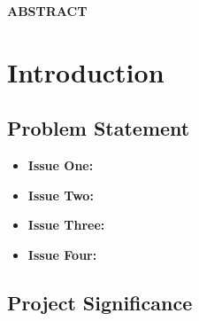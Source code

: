 \documentclass[12pt, a4paper, oneside]{report}
\newcommand{\frontmatterheading}[1]{%
  \begin{center}\Large\bfseries #1\end{center}
  \vspace{0.5cm}
}
\begin{document}
\clearpage
\thispagestyle{plain}
\frontmatterheading{ABSTRACT}

\lipsum[1]

\lipsum[2][1-5]

\clearpage
\tableofcontents
\listoffigures
{}
\listoftables
{}

\clearpage
{}
\setcounter{page}{1}

\chapter{Introduction}
\label{chap:introduction}

\lipsum[3][1-7]

\section{Problem Statement}
\label{sec:problem-statement}

\lipsum[4][1-2]

\begin{itemize}
    \item \textbf{Issue One:} \lipsum[5][1-2]
    \item \textbf{Issue Two:} \lipsum[6][1-2]
    \item \textbf{Issue Three:} \lipsum[7][1-2]
    \item \textbf{Issue Four:} \lipsum[8][1-2]
\end{itemize}

\section{Project Significance}
\label{sec:project-significance}
\end{document}
